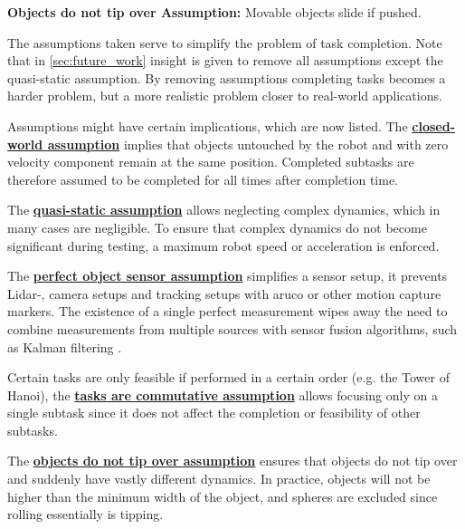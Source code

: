\begin{assumption*}%
\label{assumption:no_tipping}
\textbf{Objects do not tip over Assumption:} Movable objects slide if pushed.
\end{assumption*}\bs

The assumptions taken serve to simplify the problem of task completion. Note that in \cref{sec:future_work} insight is given to remove all assumptions except the quasi-static assumption. By removing assumptions completing tasks becomes a harder problem, but a more realistic problem closer to real-world applications.\bs

Assumptions might have certain implications, which are now listed. The \hyperref[assumption:closed_world]{\textbf{closed-world assumption}} implies that objects untouched by the robot and with zero velocity component remain at the same position. Completed subtasks are therefore assumed to be completed for all times after completion time.\bs

The \hyperref[assumption:quasi_static]{\textbf{quasi-static assumption}} allows neglecting complex dynamics, which in many cases are negligible. To ensure that complex dynamics do not become significant during testing, a maximum robot speed or acceleration is enforced.\bs
{}

The \hyperref[assumption:perfect_object_sensor]{\textbf{perfect object sensor assumption}} simplifies a sensor setup, it prevents Lidar-, camera setups and tracking setups with aruco or other motion capture markers. The existence of a single perfect measurement wipes away the need to combine measurements from multiple sources with sensor fusion algorithms, such as Kalman filtering \cite{verhaegen_filtering_2007}.\bs

Certain tasks are only feasible if performed in a certain order (e.g. the Tower of Hanoi), the \hyperref[assumption:order_does_not_matter]{\textbf{tasks are commutative assumption}} allows focusing only on a single subtask since it does not affect the completion or feasibility of other subtasks.\bs

The \hyperref[assumption:no_tipping]{\textbf{objects do not tip over assumption}} ensures that objects do not tip over and suddenly have vastly different dynamics. In practice, objects will not be higher than the minimum width of the object, and spheres are excluded since rolling essentially is tipping. 

